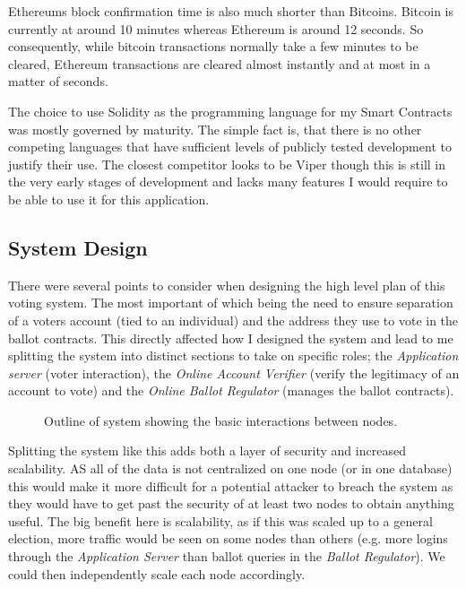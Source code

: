 \documentclass{article}
\begin{document}
Ethereums block confirmation time is also much shorter than Bitcoins. Bitcoin is currently at around 10 minutes whereas Ethereum is around 12 seconds. So consequently, while bitcoin transactions normally take a few minutes to be cleared, Ethereum transactions are cleared almost instantly and at most in a matter of seconds.

The choice to use Solidity as the programming language for my Smart Contracts was mostly governed by maturity. The simple fact is, that there is no other competing languages that have sufficient levels of publicly tested development to justify their use. The closest competitor looks to be Viper \citep{61_ethereum_viper_2017} though this is still in the very early stages of development and lacks many features I would require to be able to use it for this application.
	

\cleardoublepage
\subsection{System Design}
\label{sec:SystemDesign}
There were several points to consider when designing the high level plan of this voting system. The most important of which being the need to ensure separation of a voters account (tied to an individual) and the address they use to vote in the ballot contracts. This directly affected how I designed the system and lead to me splitting the system into distinct sections to take on specific roles; the \textit{Application server} (voter interaction), the \textit{Online Account Verifier} (verify the legitimacy of an account to vote) and the \textit{Online Ballot Regulator} (manages the ballot contracts).

\begin{figure}[h]
	\noindent
	\caption{Outline of system showing the basic interactions between nodes.}
\end{figure}

Splitting the system like this adds both a layer of security and increased scalability. AS all of the data is not centralized on one node (or in one database) this would make it more difficult for a potential attacker to breach the system as they would have to get past the security of at least two nodes to obtain anything useful. The big benefit here is scalability, as if this was scaled up to a general election, more traffic would be seen on some nodes than others (e.g. more logins through the \textit{Application Server} than ballot queries in the \textit{Ballot Regulator}). We could then independently scale each node accordingly.
\end{document}

